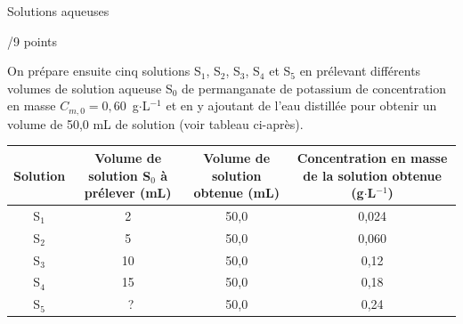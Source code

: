 \begin{doc}{Solutions aqueuses \begin{Large}
    /9 points
\end{Large}}
\newpage
On prépare ensuite cinq solutions S$_1$, S$_2$, S$_3$, S$_4$ et S$_5$ en prélevant différents volumes de solution aqueuse S$_0$ de permanganate de potassium de concentration en masse $C_{m,0} = 0,60$~g$\cdot$L$^{-1}$ et en y ajoutant de l’eau distillée pour obtenir un volume de 50,0 mL de solution (voir tableau ci-après).
\begin{center}
    \begin{tabular}{|C{0.1}|C{0.2}|C{0.2}|C{0.3}|}
        \hline
        Solution & Volume de solution S$_0$ à prélever (mL) & Volume de solution obtenue (mL) & Concentration en masse de la solution obtenue (g$\cdot$L$^{-1}$) \\
        \hline 
        S$_1$ & 2 & 50,0 & 0,024 \\
        \hline
        S$_2$ & 5 & 50,0 & 0,060 \\
        \hline
        S$_3$ & 10 & 50,0 & 0,12 \\
        \hline
        S$_4$ & 15 & 50,0 & 0,18 \\
        \hline
        S$_5$ & ~? & 50,0 & 0,24 \\
        \hline
    \end{tabular}
\end{center}


\end{doc}
